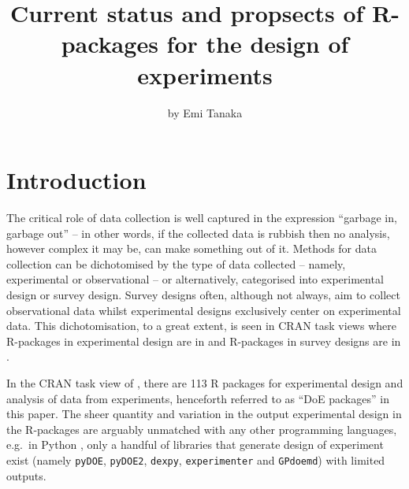 \title{Current status and propsects of R-packages for the design of
experiments}
\author{by Emi Tanaka}

\maketitle


\hypertarget{introduction}{%
\section{Introduction}\label{introduction}}

The critical role of data collection is well captured in the expression
``garbage in, garbage out'' -- in other words, if the collected data is
rubbish then no analysis, however complex it may be, can make something
out of it. Methods for data collection can be dichotomised by the type
of data collected -- namely, experimental or observational -- or
alternatively, categorised into experimental design or survey design.
Survey designs often, although not always, aim to collect observational
data whilst experimental designs exclusively center on experimental
data. This dichotomisation, to a great extent, is seen in CRAN task
views where R-packages in experimental design are in
 and R-packages in survey designs are in
.

In the CRAN task view of , there are 113 R
packages for experimental design and analysis of data from experiments,
henceforth referred to as ``DoE packages'' in this paper. The sheer
quantity and variation in the output experimental design in the
R-packages are arguably unmatched with any other programming languages,
e.g.~in Python \citep{python}, only a handful of libraries that generate
design of experiment exist (namely \texttt{pyDOE}, \texttt{pyDOE2},
\texttt{dexpy}, \texttt{experimenter} and \texttt{GPdoemd}) with limited
outputs.

